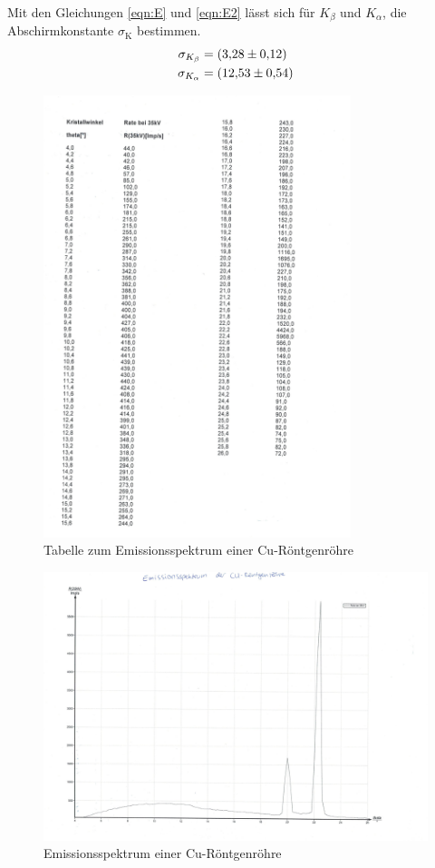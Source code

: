 Mit den Gleichungen \ref{eqn:E} und \ref{eqn:E2} lässt sich für $K_{\text{$\beta$}}$ und $K_{\text{$\alpha$}}$,
die Abschirmkonstante $\sigma_{\text{K}}$ bestimmen.
\begin{align*}
  \sigma_{\text{$K_{\beta}$}}&=\SI{3,28\pm0,12}{}\\
  \sigma_{\text{$K_{\alpha}$}}&=\SI{12,53\pm0,54}{}
\end{align*}


\begin{figure}[h!]
  \centering
  \includegraphics[width=0.8\textwidth]{emissiontab.pdf}
  \caption{Tabelle zum Emissionsspektrum einer Cu-Röntgenröhre}
  \label{tab:emiss}
\end{figure}
\begin{figure}[h!]
  \centering
  \includegraphics[width=\textwidth]{emissiongraph.pdf}
  \caption{Emissionsspektrum einer Cu-Röntgenröhre}
  \label{fig:emiss}
\end{figure}

